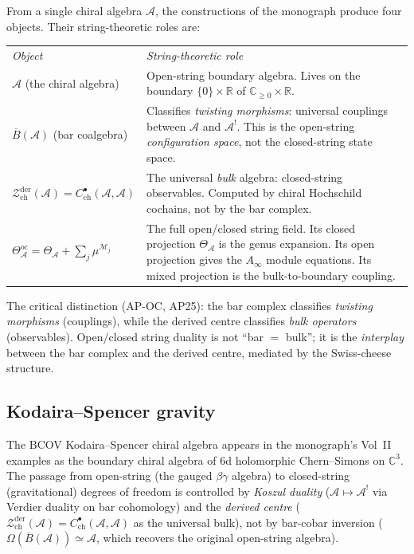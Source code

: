 \documentclass[11pt]{article}
\newcommand{\cA}{\mathcal{A}}
\newcommand{\cM}{\mathcal{M}}
\newcommand{\cZ}{\mathcal{Z}}
\newcommand{\barB}{\overline{B}}
\newcommand{\C}{\mathbb{C}}
\newcommand{\bR}{\mathbb{R}}
\begin{document}
From a single chiral algebra $\cA$, the constructions of the
monograph produce four objects.  Their string-theoretic roles
are:
\begin{center}
\renewcommand{\arraystretch}{1.4}
\begin{tabular}{@{}p{4cm}p{8cm}@{}}
\emph{Object} & \emph{String-theoretic role} \\[3pt]
$\cA$ (the chiral algebra)
  & Open-string boundary algebra.  Lives on the boundary
    $\{0\} \times \bR$ of $\C_{\geq 0} \times \bR$. \\
$\barB(\cA)$ (bar coalgebra)
  & Classifies \emph{twisting morphisms}: universal couplings
    between $\cA$ and $\cA^!$.  This is the open-string
    \emph{configuration space}, not the closed-string state
    space. \\
$\cZ^{\mathrm{der}}_{\mathrm{ch}}(\cA)
  = C^\bullet_{\mathrm{ch}}(\cA, \cA)$
  & The universal \emph{bulk} algebra: closed-string observables.
    Computed by chiral Hochschild cochains, not by the bar
    complex. \\
$\Theta^{\mathrm{oc}}_\cA = \Theta_\cA + \sum_j \mu^{\cM_j}$
  & The full open/closed string field.  Its closed projection
    $\Theta_\cA$ is the genus expansion.  Its open projection
    gives the $A_\infty$ module equations.  Its mixed projection
    is the bulk-to-boundary coupling.
\end{tabular}
\end{center}
The critical distinction (AP-OC, AP25): the bar complex classifies
\emph{twisting morphisms} (couplings), while the derived centre
classifies \emph{bulk operators} (observables).  Open/closed
string duality is not ``bar $=$ bulk''; it is the
\emph{interplay} between the bar complex and the derived centre,
mediated by the Swiss-cheese structure.

\subsection{Kodaira--Spencer gravity}
\label{subsec:ks-gravity}

The BCOV Kodaira--Spencer chiral algebra appears in the
monograph's Vol~II examples as the boundary chiral algebra
of $6$d holomorphic Chern--Simons on $\C^3$.  The passage
from open-string (the gauged $\beta\gamma$ algebra) to
closed-string (gravitational) degrees of freedom is
controlled by \emph{Koszul duality} ($\cA \mapsto \cA^!$ via
Verdier duality on bar cohomology) and the \emph{derived
centre} ($\cZ^{\mathrm{der}}_{\mathrm{ch}}(\cA) =
C^\bullet_{\mathrm{ch}}(\cA,\cA)$ as the universal bulk),
not by bar-cobar inversion ($\Omega(\barB(\cA)) \simeq \cA$,
which recovers the original open-string algebra).
\end{document}
